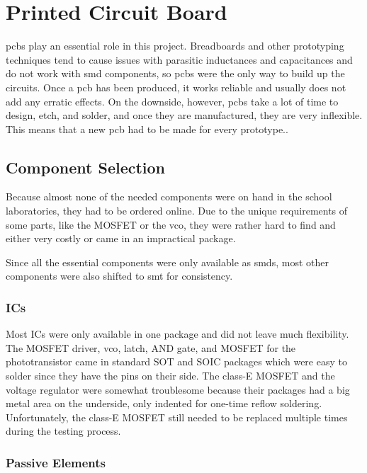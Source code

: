 \chapter{Printed Circuit Board}

\glspl{pcb} play an essential role in this project. Breadboards and other prototyping techniques tend to cause issues with parasitic inductances and capacitances and do not work with \gls{smd} components, so \glspl{pcb} were the only way to build up the circuits. Once a \gls{pcb} has been produced, it works reliable and usually does not add any erratic effects. On the downside, however, \glspl{pcb} take a lot of time to design, etch, and solder, and once they are manufactured, they are very inflexible. This means that a new \gls{pcb} had to be made for every prototype..

\section{Component Selection}

Because almost none of the needed components were on hand in the school laboratories, they had to be ordered online. Due to the unique requirements of some parts, like the MOSFET or the \gls{vco}, they were rather hard to find and either very costly or came in an impractical package.

Since all the essential components were only available as \glspl{smd}, most other components were also shifted to \gls{smt} for consistency.


\subsection{ICs}

Most ICs were only available in one package and did not leave much flexibility. The MOSFET driver, \gls{vco}, latch, AND gate, and MOSFET for the phototransistor came in standard SOT and SOIC packages which were easy to solder since they have the pins on their side. The class-E MOSFET and the voltage regulator were somewhat troublesome because their packages had a big metal area on the underside, only indented for one-time reflow soldering. Unfortunately, the class-E MOSFET still needed to be replaced multiple times during the testing process. %

\subsection{Passive Elements}

